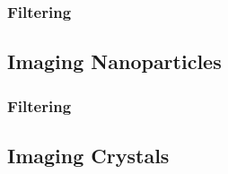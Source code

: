 \subsubsection{Filtering}

\subsection{Imaging Nanoparticles}
\subsubsection{Filtering}
\subsection{Imaging Crystals}





